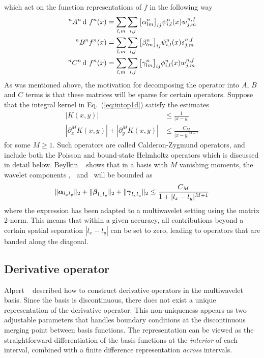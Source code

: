 which act on the function representations of $f$ in the following way
\begin{align}
    \label{eq:Aact}
    \A{n}{n}\waveletrep{f}{n}(x) &= \sum_{l,m} \sum_{i,j}
	\big[\alpha^n_{lm}\big]_{ij}
        \wavelet^n_{i,l}(x) 
	\waveletcoef^{n,f}_{j,m}\\
    \label{eq:Bact}
    \B{n}{n}\scalingrep{f}{n}(x) &= \sum_{l,m} \sum_{i,j}
	\big[\beta^n_{lm}\big]_{ij}
        \wavelet^n_{i,l}(x) 
	\scalingcoef^{n,f}_{j,m}\\
    \label{eq:Cact}
    \C{n}{n}\waveletrep{f}{n}(x) &= \sum_{l,m} \sum_{i,j}
	\big[\gamma^n_{lm}\big]_{ij}
        \scaling^n_{i,l}(x) 
	\waveletcoef^{n,f}_{j,m}
\end{align}
As was mentioned above, the motivation for decomposing the operator into $A$, $B$
and $C$ terms is that these matrices will be sparse for certain operators. Suppose 
that the integral kernel in Eq.~(\ref{eq:intop1d}) satisfy the estimates
\begin{align}
    |K(x,y)| &\leq \frac{1}{|x-y|}\\
    |\partial_x^M K(x,y)|+ |\partial_y^M K(x,y)| &\leq \frac{C_M}{|x-y|^{M+1}}
\end{align}
for some $M\geq1$. Such operators are called Calderon-Zygmund operators, and
include both the Poisson and bound-state Helmholtz operators which is discussed 
in detail below. Beylkin \etal~\cite{Beylkin:1991} 
shows that in a basis with $M$ vanishing moments, the wavelet 
components \alphamat, \betamat\ and \gammamat\ will be bounded as
\begin{equation}
    \label{eq:operbandwidth}
    \|\boldsymbol{\alpha}_{l_xl_y}\|_2 + \|\boldsymbol{\beta}_{l_xl_y}\|_2 + \|\boldsymbol{\gamma}_{l_xl_y}\|_2 
	\leq \frac{C_M}{1+|l_x-l_y|^{M+1}}
\end{equation}
where the expression has been adapted to a multiwavelet setting using the matrix
2-norm. This means that within a given accuracy, all contributions beyond a certain 
spatial separation $|l_x-l_y|$ can be set to zero, leading to operators that are 
banded along the diagonal.

\subsection{Derivative operator}\label{sec:diff_oper}
Alpert \etal~\cite{Alpert:2002p149} described how to construct derivative operators in
the multiwavelet basis. Since the basis is discontinuous, there does not exist a
unique representation of the derivative operator. This non-uniqueness
appears as two adjustable parameters that handles boundary conditions at the
discontinuous merging point between basis functions. The representation can be
viewed as the straightforward differentiation of the basis functions at the 
\emph{interior} of each interval, combined with a finite difference representation
\emph{across} intervals.

